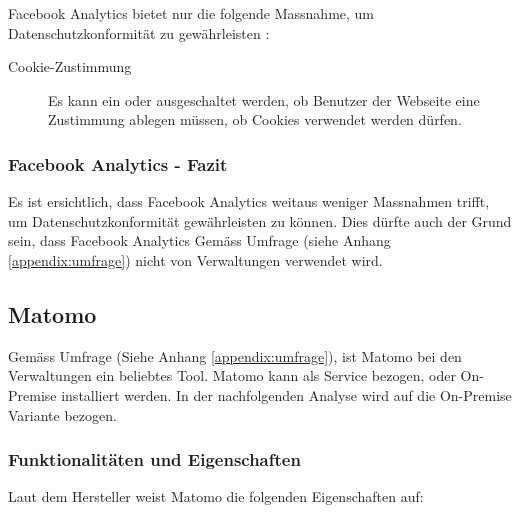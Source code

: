 Facebook Analytics bietet nur die folgende Massnahme, um Datenschutzkonformität zu gewährleisten \parencite{facebookAnalyticsGDPR}: 

\begin{description}
  \item[Cookie-Zustimmung] Es kann ein oder ausgeschaltet werden, ob Benutzer der Webseite eine Zustimmung ablegen müssen, ob Cookies verwendet werden dürfen.
\end{description}

\subsubsection{Facebook Analytics - Fazit}
Es ist ersichtlich, dass Facebook Analytics weitaus weniger Massnahmen trifft, um Datenschutzkonformität gewährleisten zu können. Dies dürfte auch der Grund sein, dass Facebook Analytics Gemäss Umfrage (siehe Anhang \ref{appendix:umfrage}) nicht von Verwaltungen verwendet wird.

\subsection{Matomo} \label{subsec:matomomarkt}

Gemäss Umfrage (Siehe Anhang \ref{appendix:umfrage}), ist Matomo bei den Verwaltungen ein beliebtes Tool. Matomo kann als Service bezogen, oder On-Premise installiert werden. In der nachfolgenden Analyse wird auf die On-Premise Variante bezogen.

\subsubsection{Funktionalitäten und Eigenschaften}
Laut dem Hersteller weist Matomo die folgenden Eigenschaften auf:

